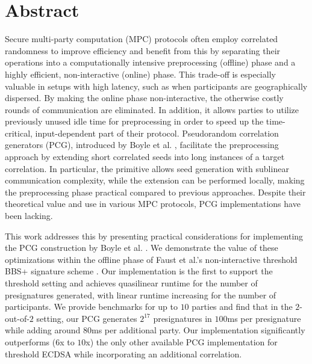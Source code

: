 \section*{Abstract}
Secure multi-party computation (MPC) protocols often employ correlated randomness to improve efficiency and benefit from this by separating their operations into a computationally intensive preprocessing (offline) phase and a highly efficient, non-interactive (online) phase. This trade-off is especially valuable in setups with high latency, such as when participants are geographically dispersed. By making the online phase non-interactive, the otherwise costly rounds of communication are eliminated. In addition, it allows parties to utilize previously unused idle time for preprocessing in order to speed up the time-critical, input-dependent part of their protocol. Pseudorandom correlation generators (PCG), introduced by Boyle et al. \cite{boyle2019efficient, boyle2020efficient}, facilitate the preprocessing approach by extending short correlated seeds into long instances of a target correlation. In particular, the primitive allows seed generation with sublinear communication complexity, while the extension can be performed locally, making the preprocessing phase practical compared to previous approaches. Despite their theoretical value and use in various MPC protocols, PCG implementations have been lacking. 

This work addresses this by presenting practical considerations for implementing the PCG construction by Boyle et al. \cite{boyle2020efficient}. We demonstrate the value of these optimizations within the offline phase of Faust et al.'s non-interactive threshold BBS+ signature scheme \cite{faust2023non}. Our implementation is the first to support the threshold setting and achieves quasilinear runtime for the number of presignatures generated, with linear runtime increasing for the number of participants. We provide benchmarks for up to $10$ parties and find that in the $2$-out-of-$2$ setting, our PCG generates $2^{17}$ presignatures in $100$ms per presignature while adding around $80$ms per additional party. Our implementation significantly outperforms ($6$x to $10$x) the only other available PCG implementation for threshold ECDSA \cite{abram2022low} while incorporating an additional correlation.